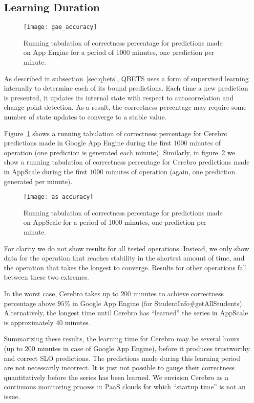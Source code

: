 \subsection{Learning Duration}
\label{sec:learning}

\begin{figure}
\centering
\texttt{[image: gae\_accuracy]}
\caption{Running tabulation of correctness percentage for predictions made on App Engine for a period
of $1000$ minutes, one prediction per minute.}
\label{fig:gae_accuracy}
\end{figure}

As described in subsection~\ref{sec:qbets},
QBETS uses a form of supervised learning internally to determine each of its
bound predictions.  Each time a new prediction is presented, it updates its
internal state with respect to autocorrelation and change-point detection.  As
a result, the correctness percentage may require some number of state updates
to converge to a stable value.

Figure~\ref{fig:gae_accuracy} shows a running tabulation of
correctness percentage for Cerebro
predictions made in Google App Engine during the first 
$1000$ minutes of operation (one prediction is generated each minute). 
Similarly, in figure~\ref{fig:as_accuracy} we show a running tabulation of
correctness percentage for Cerebro
predictions made in AppScale during the first 
$1000$ minutes of operation (again, one prediction generated per minute). 

\begin{figure}
\centering
\texttt{[image: as\_accuracy]}
\caption{Running tabulation of correctness percentage for predictions made on AppScale for a period
of $1000$ minutes, one prediction per minute.}
\label{fig:as_accuracy}
\end{figure}

For clarity we do not show results for all tested operations. Instead,
we only show data for the operation that reaches stability in the shortest
amount of time, and the operation that takes the longest to converge.
Results for other operations fall between these two extremes.

In the worst case, Cerebro takes up to $200$ minutes to 
achieve correctness percentage above $95\%$
in Google App Engine (for StudentInfo\#getAllStudents).
Alternatively, the longest time until Cerebro has ``learned'' the series in
AppScale is approximately $40$ minutes.

Summarizing these results, 
the learning time for Cerebro may be
several hours (up to $200$ minutes in case of 
Google App Engine), before it produces trustworthy and correct 
SLO predictions.  The predictions made during this learning period are not
necessarily incorrect.  It is just not possible to gauge their correctness
quantitatively before the series has been learned.  We envision Cerebro as a
continuous monitoring process in PaaS clouds for which ``startup time'' is not 
an issue.